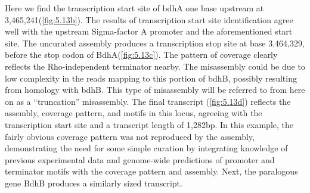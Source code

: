 Here we find the transcription start site of bdhA one base upstream at 3,465,241(\ref{fig:5.13b}). The results of transcription start site identification agree well with the upstream Sigma-factor A promoter and the aforementioned start site. The uncurated assembly produces a transcription stop site at base 3,464,329, before the stop codon of BdhA(\ref{fig:5.13c}). The pattern of coverage clearly reflects the Rho-independent terminator nearby. The misassembly could be due to low complexity in the reads mapping to this portion of bdhB, possibly resulting from homology with bdhB. This type of misassembly will be referred to from here on as a ``truncation'' misassembly. The final transcript (\ref{fig:5.13d}) reflects the assembly, coverage pattern, and motifs in this locus, agreeing with the transcription start site and a transcript length of 1,282bp. In this example, the fairly obvious coverage pattern was not reproduced by the assembly, demonstrating the need for some simple curation by integrating knowledge of previous experimental data and genome-wide predictions of promoter and terminator motifs with the coverage pattern and assembly. Next, the paralogous gene BdhB produces a similarly sized transcript.

